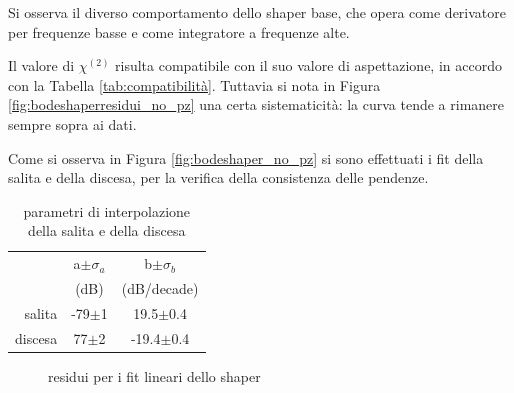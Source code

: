 \documentclass{article}
\begin{document}
Si osserva il diverso comportamento dello shaper base, che opera come derivatore per frequenze basse e come integratore a frequenze
alte.

Il valore di $\chi^{(2)}$ risulta compatibile con il suo valore di aspettazione, in accordo con la Tabella \ref{tab:compatibilità}.
Tuttavia si nota in Figura \ref{fig:bodeshaperresidui_no_pz} una certa sistematicità: la curva tende
a rimanere sempre sopra ai dati.

Come si osserva in Figura \ref{fig:bodeshaper_no_pz} si sono effettuati i fit della salita e della discesa,
per la verifica della consistenza delle pendenze.


\begin{table}[ht]
    \centering
    \begin{tabular}{rcccc}
        \toprule
                &\multicolumn{2}{c}{a$\pm \sigma_a$} &\multicolumn{2}{c}{b$\pm \sigma_b$}\\
                &\multicolumn{2}{c}{(dB)}  &\multicolumn{2}{c}{(dB/decade)}\\
        \midrule
        salita  &\multicolumn{2}{c}{-79$\pm$1}&\multicolumn{2}{c}{19.5$\pm$0.4}\\
        discesa &\multicolumn{2}{c}{77$\pm$2}&\multicolumn{2}{c}{-19.4$\pm$0.4}\\
        \bottomrule
    \end{tabular}
    \caption{parametri di interpolazione della salita e della discesa}
\end{table}

\begin{figure}[H]
    \centering
    \caption{residui per i fit lineari dello shaper}
    \label{fig:residuishapersladis}
\end{figure}
\end{document}
